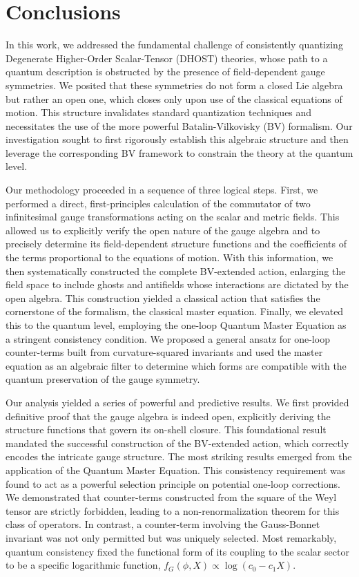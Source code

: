\documentclass[twocolumn]{aastex631}
\begin{document}
\section{Conclusions}
\label{sec:conclusions}
In this work, we addressed the fundamental challenge of consistently quantizing Degenerate Higher-Order Scalar-Tensor (DHOST) theories, whose path to a quantum description is obstructed by the presence of field-dependent gauge symmetries. We posited that these symmetries do not form a closed Lie algebra but rather an open one, which closes only upon use of the classical equations of motion. This structure invalidates standard quantization techniques and necessitates the use of the more powerful Batalin-Vilkovisky (BV) formalism. Our investigation sought to first rigorously establish this algebraic structure and then leverage the corresponding BV framework to constrain the theory at the quantum level.

Our methodology proceeded in a sequence of three logical steps. First, we performed a direct, first-principles calculation of the commutator of two infinitesimal gauge transformations acting on the scalar and metric fields. This allowed us to explicitly verify the open nature of the gauge algebra and to precisely determine its field-dependent structure functions and the coefficients of the terms proportional to the equations of motion. With this information, we then systematically constructed the complete BV-extended action, enlarging the field space to include ghosts and antifields whose interactions are dictated by the open algebra. This construction yielded a classical action that satisfies the cornerstone of the formalism, the classical master equation. Finally, we elevated this to the quantum level, employing the one-loop Quantum Master Equation as a stringent consistency condition. We proposed a general ansatz for one-loop counter-terms built from curvature-squared invariants and used the master equation as an algebraic filter to determine which forms are compatible with the quantum preservation of the gauge symmetry.

Our analysis yielded a series of powerful and predictive results. We first provided definitive proof that the gauge algebra is indeed open, explicitly deriving the structure functions that govern its on-shell closure. This foundational result mandated the successful construction of the BV-extended action, which correctly encodes the intricate gauge structure. The most striking results emerged from the application of the Quantum Master Equation. This consistency requirement was found to act as a powerful selection principle on potential one-loop corrections. We demonstrated that counter-terms constructed from the square of the Weyl tensor are strictly forbidden, leading to a non-renormalization theorem for this class of operators. In contrast, a counter-term involving the Gauss-Bonnet invariant was not only permitted but was uniquely selected. Most remarkably, quantum consistency fixed the functional form of its coupling to the scalar sector to be a specific logarithmic function, $f_G(\phi, X) \propto \log(c_0 - c_1 X)$.
\end{document}
